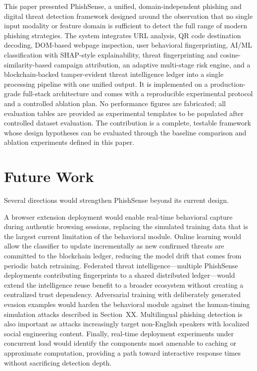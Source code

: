 \documentclass[conference]{IEEEtran}
\begin{document}
This paper presented PhishSense, a unified, domain-independent phishing and digital threat
detection framework designed around the observation that no single input modality or feature
domain is sufficient to detect the full range of modern phishing strategies.
The system integrates URL analysis, QR code destination decoding, DOM-based webpage inspection,
user behavioral fingerprinting, AI/ML classification with SHAP-style explainability, threat
fingerprinting and cosine-similarity-based campaign attribution, an adaptive multi-stage risk
engine, and a blockchain-backed tamper-evident threat intelligence ledger into a single processing
pipeline with one unified output.
It is implemented on a production-grade full-stack architecture and comes with a reproducible
experimental protocol and a controlled ablation plan.
No performance figures are fabricated; all evaluation tables are provided as experimental templates
to be populated after controlled dataset evaluation.
The contribution is a complete, testable framework whose design hypotheses can be evaluated
through the baseline comparison and ablation experiments defined in this paper.

\section{Future Work}

Several directions would strengthen PhishSense beyond its current design.

A browser extension deployment would enable real-time behavioral capture during authentic
browsing sessions, replacing the simulated training data that is the largest current limitation
of the behavioral module.
Online learning would allow the classifier to update incrementally as new confirmed threats are
committed to the blockchain ledger, reducing the model drift that comes from periodic batch
retraining.
Federated threat intelligence---multiple PhishSense deployments contributing fingerprints to a
shared distributed ledger---would extend the intelligence reuse benefit to a broader ecosystem
without creating a centralized trust dependency.
Adversarial training with deliberately generated evasion examples would harden the behavioral
module against the human-timing simulation attacks described in Section~XX.
Multilingual phishing detection is also important as attacks increasingly target non-English
speakers with localized social engineering content.
Finally, real-time deployment experiments under concurrent load would identify the components
most amenable to caching or approximate computation, providing a path toward interactive response
times without sacrificing detection depth.
\end{document}
